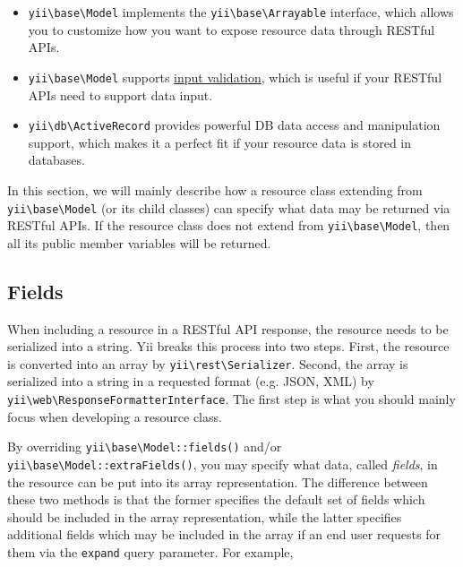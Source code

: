 \begin{itemize}
\item \texttt{yii{\allowbreak{}\textbackslash}base{\allowbreak{}\textbackslash}Model} implements the \texttt{yii{\allowbreak{}\textbackslash}base{\allowbreak{}\textbackslash}Arrayable} interface, which allows you to
customize how you want to expose resource data through RESTful APIs.
\item \texttt{yii{\allowbreak{}\textbackslash}base{\allowbreak{}\textbackslash}Model} supports \hyperref[input-validation.md]{input validation}, which is useful if your RESTful APIs
need to support data input.
\item \texttt{yii{\allowbreak{}\textbackslash}db{\allowbreak{}\textbackslash}ActiveRecord} provides powerful DB data access and manipulation support, which makes it
a perfect fit if your resource data is stored in databases.
\end{itemize}
In this section, we will mainly describe how a resource class extending from \texttt{yii{\allowbreak{}\textbackslash}base{\allowbreak{}\textbackslash}Model} (or its child classes)
can specify what data may be returned via RESTful APIs. If the resource class does not extend from \texttt{yii{\allowbreak{}\textbackslash}base{\allowbreak{}\textbackslash}Model},
then all its public member variables will be returned.

\subsection{Fields \label{rest-resources.md::fields}}
When including a resource in a RESTful API response, the resource needs to be serialized into a string.
Yii breaks this process into two steps. First, the resource is converted into an array by \texttt{yii{\allowbreak{}\textbackslash}rest{\allowbreak{}\textbackslash}Serializer}.
Second, the array is serialized into a string in a requested format (e.g. JSON, XML) by
\texttt{yii{\allowbreak{}\textbackslash}web{\allowbreak{}\textbackslash}ResponseFormatterInterface}. The first step is what you should mainly focus when
developing a resource class.

By overriding \texttt{yii{\allowbreak{}\textbackslash}base{\allowbreak{}\textbackslash}Model\allowbreak{}::\allowbreak{}fields()} and/or \texttt{yii{\allowbreak{}\textbackslash}base{\allowbreak{}\textbackslash}Model\allowbreak{}::\allowbreak{}extraFields()},
you may specify what data, called \textit{fields}, in the resource can be put into its array representation.
The difference between these two methods is that the former specifies the default set of fields which should
be included in the array representation, while the latter specifies additional fields which may be included
in the array if an end user requests for them via the \lstinline|expand| query parameter. For example,

